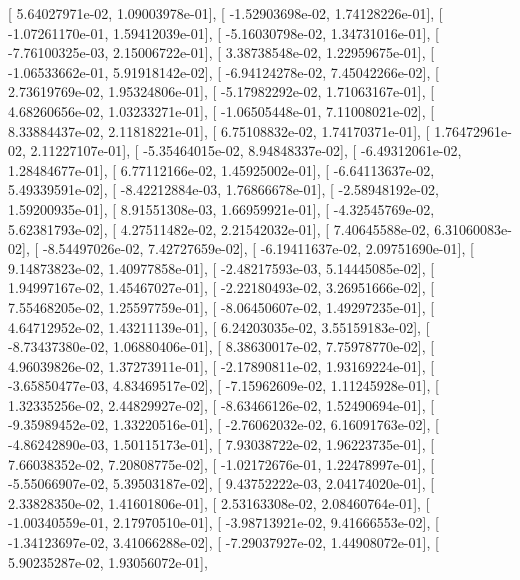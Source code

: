 \documentclass{article}
\begin{document}
       [  5.64027971e-02,   1.09003978e-01],
       [ -1.52903698e-02,   1.74128226e-01],
       [ -1.07261170e-01,   1.59412039e-01],
       [ -5.16030798e-02,   1.34731016e-01],
       [ -7.76100325e-03,   2.15006722e-01],
       [  3.38738548e-02,   1.22959675e-01],
       [ -1.06533662e-01,   5.91918142e-02],
       [ -6.94124278e-02,   7.45042266e-02],
       [  2.73619769e-02,   1.95324806e-01],
       [ -5.17982292e-02,   1.71063167e-01],
       [  4.68260656e-02,   1.03233271e-01],
       [ -1.06505448e-01,   7.11008021e-02],
       [  8.33884437e-02,   2.11818221e-01],
       [  6.75108832e-02,   1.74170371e-01],
       [  1.76472961e-02,   2.11227107e-01],
       [ -5.35464015e-02,   8.94848337e-02],
       [ -6.49312061e-02,   1.28484677e-01],
       [  6.77112166e-02,   1.45925002e-01],
       [ -6.64113637e-02,   5.49339591e-02],
       [ -8.42212884e-03,   1.76866678e-01],
       [ -2.58948192e-02,   1.59200935e-01],
       [  8.91551308e-03,   1.66959921e-01],
       [ -4.32545769e-02,   5.62381793e-02],
       [  4.27511482e-02,   2.21542032e-01],
       [  7.40645588e-02,   6.31060083e-02],
       [ -8.54497026e-02,   7.42727659e-02],
       [ -6.19411637e-02,   2.09751690e-01],
       [  9.14873823e-02,   1.40977858e-01],
       [ -2.48217593e-03,   5.14445085e-02],
       [  1.94997167e-02,   1.45467027e-01],
       [ -2.22180493e-02,   3.26951666e-02],
       [  7.55468205e-02,   1.25597759e-01],
       [ -8.06450607e-02,   1.49297235e-01],
       [  4.64712952e-02,   1.43211139e-01],
       [  6.24203035e-02,   3.55159183e-02],
       [ -8.73437380e-02,   1.06880406e-01],
       [  8.38630017e-02,   7.75978770e-02],
       [  4.96039826e-02,   1.37273911e-01],
       [ -2.17890811e-02,   1.93169224e-01],
       [ -3.65850477e-03,   4.83469517e-02],
       [ -7.15962609e-02,   1.11245928e-01],
       [  1.32335256e-02,   2.44829927e-02],
       [ -8.63466126e-02,   1.52490694e-01],
       [ -9.35989452e-02,   1.33220516e-01],
       [ -2.76062032e-02,   6.16091763e-02],
       [ -4.86242890e-03,   1.50115173e-01],
       [  7.93038722e-02,   1.96223735e-01],
       [  7.66038352e-02,   7.20808775e-02],
       [ -1.02172676e-01,   1.22478997e-01],
       [ -5.55066907e-02,   5.39503187e-02],
       [  9.43752222e-03,   2.04174020e-01],
       [  2.33828350e-02,   1.41601806e-01],
       [  2.53163308e-02,   2.08460764e-01],
       [ -1.00340559e-01,   2.17970510e-01],
       [ -3.98713921e-02,   9.41666553e-02],
       [ -1.34123697e-02,   3.41066288e-02],
       [ -7.29037927e-02,   1.44908072e-01],
       [  5.90235287e-02,   1.93056072e-01],
\end{document}
